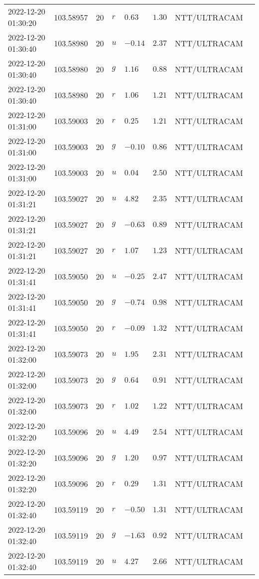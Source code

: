 \documentclass{nature_plusfigure}
\begin{document}
\begin{supplement}
\begin{center}
\begin{longtable}{llllllll}
2022-12-20 01:30:20 & 103.58957 & 20 & $r$ & $0.63$ & $1.30$ & NTT/ULTRACAM &  \\ 
2022-12-20 01:30:40 & 103.58980 & 20 & $u$ & $-0.14$ & $2.37$ & NTT/ULTRACAM &  \\ 
2022-12-20 01:30:40 & 103.58980 & 20 & $g$ & $1.16$ & $0.88$ & NTT/ULTRACAM &  \\ 
2022-12-20 01:30:40 & 103.58980 & 20 & $r$ & $1.06$ & $1.21$ & NTT/ULTRACAM &  \\ 
2022-12-20 01:31:00 & 103.59003 & 20 & $r$ & $0.25$ & $1.21$ & NTT/ULTRACAM &  \\ 
2022-12-20 01:31:00 & 103.59003 & 20 & $g$ & $-0.10$ & $0.86$ & NTT/ULTRACAM &  \\ 
2022-12-20 01:31:00 & 103.59003 & 20 & $u$ & $0.04$ & $2.50$ & NTT/ULTRACAM &  \\ 
2022-12-20 01:31:21 & 103.59027 & 20 & $u$ & $4.82$ & $2.35$ & NTT/ULTRACAM &  \\ 
2022-12-20 01:31:21 & 103.59027 & 20 & $g$ & $-0.63$ & $0.89$ & NTT/ULTRACAM &  \\ 
2022-12-20 01:31:21 & 103.59027 & 20 & $r$ & $1.07$ & $1.23$ & NTT/ULTRACAM &  \\ 
2022-12-20 01:31:41 & 103.59050 & 20 & $u$ & $-0.25$ & $2.47$ & NTT/ULTRACAM &  \\ 
2022-12-20 01:31:41 & 103.59050 & 20 & $g$ & $-0.74$ & $0.98$ & NTT/ULTRACAM &  \\ 
2022-12-20 01:31:41 & 103.59050 & 20 & $r$ & $-0.09$ & $1.32$ & NTT/ULTRACAM &  \\ 
2022-12-20 01:32:00 & 103.59073 & 20 & $u$ & $1.95$ & $2.31$ & NTT/ULTRACAM &  \\ 
2022-12-20 01:32:00 & 103.59073 & 20 & $g$ & $0.64$ & $0.91$ & NTT/ULTRACAM &  \\ 
2022-12-20 01:32:00 & 103.59073 & 20 & $r$ & $1.02$ & $1.22$ & NTT/ULTRACAM &  \\ 
2022-12-20 01:32:20 & 103.59096 & 20 & $u$ & $4.49$ & $2.54$ & NTT/ULTRACAM &  \\ 
2022-12-20 01:32:20 & 103.59096 & 20 & $g$ & $1.20$ & $0.97$ & NTT/ULTRACAM &  \\ 
2022-12-20 01:32:20 & 103.59096 & 20 & $r$ & $0.29$ & $1.31$ & NTT/ULTRACAM &  \\ 
2022-12-20 01:32:40 & 103.59119 & 20 & $r$ & $-0.50$ & $1.31$ & NTT/ULTRACAM &  \\ 
2022-12-20 01:32:40 & 103.59119 & 20 & $g$ & $-1.63$ & $0.92$ & NTT/ULTRACAM &  \\ 
2022-12-20 01:32:40 & 103.59119 & 20 & $u$ & $4.27$ & $2.66$ & NTT/ULTRACAM &  \\ 

\end{longtable}
\end{center}
\end{supplement}
\end{document}
